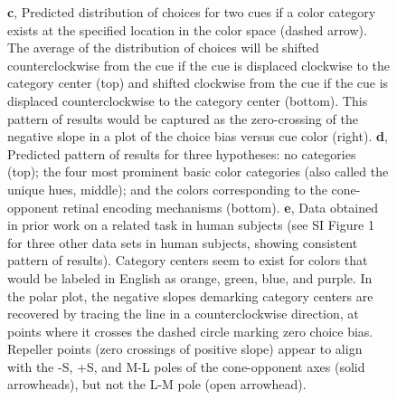 \begin{figure}
\begin{fullwidth}
{	\textbf{c}, Predicted distribution of choices for two cues if a color category exists at the specified location in the color space (dashed arrow). 
	The average of the distribution of choices will be shifted counterclockwise from the cue if the cue is displaced clockwise to the category center (top) and shifted clockwise from the cue if the cue is displaced counterclockwise to the category center (bottom). This pattern of results would be captured as the zero-crossing of the negative slope in a plot of the choice bias versus cue color (right). 
	\textbf{d}, Predicted pattern of results for three hypotheses: no categories (top); the four most prominent basic color categories (also called the unique hues, middle); and the colors corresponding to the cone-opponent retinal encoding mechanisms (bottom). 
	\textbf{e}, Data obtained in prior work on a related task in human subjects (see SI Figure 1 for three other data sets in human subjects, showing consistent pattern of results). Category centers seem to exist for colors that would be labeled in English as orange, green, blue, and purple. 
	In the polar plot, the negative slopes demarking category centers are recovered by tracing the line in a counterclockwise direction, at points where it crosses the dashed circle marking zero choice bias. Repeller points (zero crossings of positive slope) appear to align with the -S, +S, and M-L poles of the cone-opponent axes (solid arrowheads), but not the L-M pole (open arrowhead).} 
    \label{fig:ParadigmAnalysisPredictions}
    \end{fullwidth}
\end{figure}

